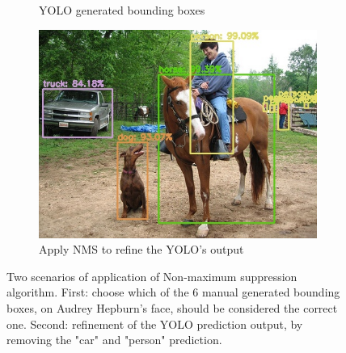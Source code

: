 \begin{figure}[!h]
\begin{subfigure}{.35\linewidth}
		\captionsetup{margin=0.3cm}
		\caption{YOLO generated bounding boxes}
		\label{fig:sub_noNMS_yolo}
	\end{subfigure}
	\begin{subfigure}{.35\linewidth}
		\includegraphics[width=1\linewidth]{images/detection/ex2_yolo}
		\captionsetup{margin=0.3cm}
		\caption{Apply NMS to refine the YOLO's output}
		\label{fig:sub_withNMS_yolo}
	\end{subfigure}
	\captionsetup{margin=0.5cm}
	\caption[Examples of application of NMS post-processing.]{Two scenarios of application of Non-maximum suppression algorithm. First: choose which of the 6 manual generated bounding boxes, on Audrey Hepburn's face, should be considered the correct one. Second: refinement of the YOLO prediction output, by removing the "car" and "person" prediction.}
	\label{fig:nms}
\end{figure}


